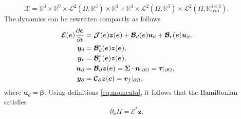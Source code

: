\documentclass{svjour3}                     %
\begin{document}
\[
\mathscr{X} = \mathbb{R}^3 \times \mathbb{R}^9 \times \mathscr{L}^2(\Omega, \mathbb{R}^{3}) \times \mathbb{R}^3 \times \mathbb{R}^3 \times \mathscr{L}^2(\Omega, \mathbb{R}^{3}) \times \mathscr{L}^2(\Omega, \mathbb{R}^{3\times 3}_{\text{sym}}).
\] 
The dynamics can be rewritten compactly as follows
\begin{equation}
\label{eq:MFD_pHDAE}
\begin{aligned}
\bm{\mathcal{E}}(\bm{e}) \diffp{\bm{e}}{t} &= \bm{\mathcal{J}}(\bm{e}) \bm{z}(\bm{e}) + \bm{\mathcal{B}}_d(\bm{e}) \bm{u}_d + \bm{\mathcal{B}}_r(\bm{e}) \bm{u}_\partial, \\
\bm{y}_d &= \bm{\mathcal{B}}_d^*(\bm{e}) \bm{z}(\bm{e}), \\
\bm{y}_r &= \bm{\mathcal{B}}_r^*(\bm{e}) \bm{z}(\bm{e}), \\
\bm{u}_\partial &= \bm{\mathcal{B}}_{\partial} \bm{z}(\bm{e}) =  \bm\Sigma \cdot \bm{n}|_{\partial \Omega} = \bm\tau|_{\partial \Omega}, \\
\bm{y}_\partial &= \bm{\mathcal{C}}_{\partial} \bm{z}(\bm{e}) = \bm{v}_f|_{\partial \Omega},
\end{aligned}
\end{equation}
where $\bm{u}_d = \bm\beta$. Using definitions  \eqref{eq:momenta}, it follows that the Hamiltonian  satisfies 
\begin{equation}
\label{eq:gradH}
\partial_{\bm{e}} H = \bm{\mathcal{E}}^* \bm{z}.
\end{equation}
\end{document}
